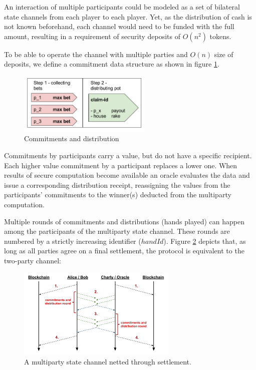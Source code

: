 An interaction of multiple participants could be modeled as a set of bilateral state channels from each player to each player. Yet, as the distribution of cash is not known beforehand, each channel would need to be funded with the full amount, resulting in a requirement of security deposits of \(O(n^2)\) tokens.

To be able to operate the channel with multiple parties and \(O(n)\) size of deposits, we define a commitment data structure as shown in figure \ref{mpc_round}. 

\begin{figure}[!ht]
\centering
\includegraphics[width=2.5in]{images/bet.png}
\caption{Commitments and distribution}
\label{mpc_round}
\end{figure}

Commitments by participants carry a value, but do not have a specific recipient. Each higher value commitment by a participant replaces a lower one. When results of secure computation become available an oracle evaluates the data and issue a corresponding distribution receipt, reassigning the values from the participants' commitments to the winner(s) deducted from the multiparty computation.

Multiple rounds of commitments and distributions (hands played) can happen among the participants of the multiparty state channel. These rounds are numbered by a strictly increasing identifier (\(handId\)). Figure \ref{mpc_settle} depicts that, as long as all parties agree on a final settlement, the protocol is equivalent to the two-party channel:

\begin{figure}[!ht]
\centering
\includegraphics[width=3.0in]{images/multiSettle.png}
\caption{A multiparty state channel netted through settlement.}
\label{mpc_settle}
\end{figure}

